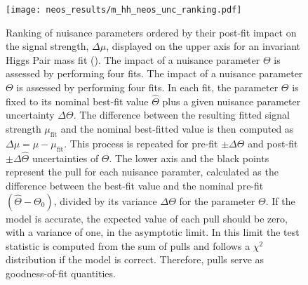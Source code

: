 \begin{figure}
    \centering
    \texttt{[image: neos\_results/m\_hh\_neos\_unc\_ranking.pdf]}
    \caption[]{Ranking of nuisance parameters ordered by their post-fit impact on the signal strength, $\Delta\mu$, displayed on the upper axis for an invariant Higgs Pair mass fit (\mhh{}). The impact of a nuisance parameter $\Theta$ is assessed by performing four fits. The impact of a nuisance parameter $\Theta$ is assessed by performing four fits. In each fit, the parameter $\Theta$ is fixed to its nominal best-fit value $\hat{\Theta}$ plus a given nuisance parameter uncertainty $\Delta\Theta$. The difference between the resulting fitted signal strength $\mu_\text{fit}$ and the nominal best-fitted value is then computed as $\Delta\mu=\hat{\mu} - \mu_\text{fit}$. This process is repeated for pre-fit $\pm\Delta\Theta$ and post-fit $\pm\Delta\hat{\Theta}$ uncertainties of $\Theta$. The lower axis and the black points represent the pull for each nuisance paramter, calculated as the difference between the best-fit value and the nominal pre-fit $(\hat{\Theta} - \Theta_0)$, divided by its variance $\Delta\Theta$ for the parameter $\Theta$. If the model is accurate, the expected value of each pull should be zero, with a variance of one, in the asymptotic limit. In this limit the test statistic is computed from the sum of pulls and follows a $\chi^2$ distribution if the model is correct. Therefore, pulls serve as goodness-of-fit quantities. }
    \label{fig:m_hh_neos_unc_ranking}
\end{figure}


